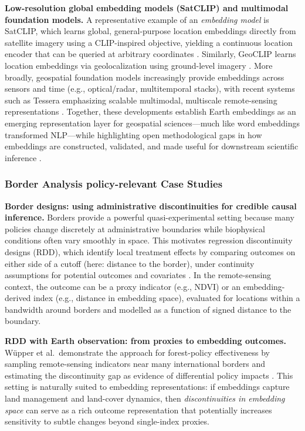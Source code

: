 \noindent\textbf{Low-resolution global embedding models (SatCLIP) and multimodal foundation models.}
A representative example of an \emph{embedding model} is SatCLIP, which learns global, general-purpose location embeddings directly from satellite imagery using a CLIP-inspired objective, yielding a continuous location encoder that can be queried at arbitrary coordinates \citep{klemmer2025satclip,klemmer2025earth}. Similarly, GeoCLIP learns location embeddings via geolocalization using ground-level imagery \citep{vivanco2023geoclip}. More broadly, geospatial foundation models increasingly provide embeddings across sensors and time (e.g., optical/radar, multitemporal stacks), with recent systems such as Tessera emphasizing scalable multimodal, multiscale remote-sensing representations \citep{feng2025tessera,klemmer2025earth}. Together, these developments establish Earth embeddings as an emerging representation layer for geospatial sciences—much like word embeddings transformed NLP—while highlighting open methodological gaps in how embeddings are constructed, validated, and made useful for downstream scientific inference \citep{klemmer2025earth}. %

\subsubsection*{Border Analysis policy-relevant Case Studies}

\noindent\textbf{Border designs: using administrative discontinuities for credible causal inference.}
Borders provide a powerful quasi-experimental setting because many policies change discretely at administrative boundaries while biophysical conditions often vary smoothly in space. This motivates regression discontinuity designs (RDD), which identify local treatment effects by comparing outcomes on either side of a cutoff (here: distance to the border), under continuity assumptions for potential outcomes and covariates \citep{imbenslemieux2008}. In the remote-sensing context, the outcome can be a proxy indicator (e.g., NDVI) or an embedding-derived index (e.g., distance in embedding space), evaluated for locations within a bandwidth around borders and modelled as a function of signed distance to the boundary.

\noindent\textbf{RDD with Earth observation: from proxies to embedding outcomes.}
W\"upper et al.\ demonstrate the approach for forest-policy effectiveness by sampling remote-sensing indicators near many international borders and estimating the discontinuity gap as evidence of differential policy impacts \citep{Wuepper2024GlobalForestBorders}. This setting is naturally suited to embedding representations: if embeddings capture land management and land-cover dynamics, then \emph{discontinuities in embedding space} can serve as a rich outcome representation that potentially increases sensitivity to subtle changes beyond single-index proxies.

